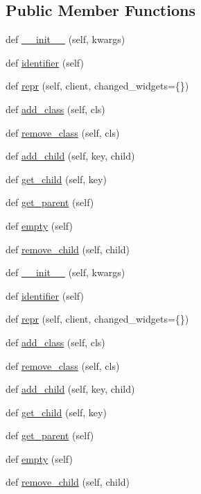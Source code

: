 \subsection*{Public Member Functions}
\begin{DoxyCompactItemize}
\item 
def \hyperlink{classremi_1_1gui_1_1Tag_ac6cbf96099450073941155428905ae42}{\+\_\+\+\_\+init\+\_\+\+\_\+} (self, kwargs)
\item 
def \hyperlink{classremi_1_1gui_1_1Tag_af8e3045fefdaee8350adb573f9207c50}{identifier} (self)
\item 
def \hyperlink{classremi_1_1gui_1_1Tag_a4bd241477678dc78202f410be8d53f75}{repr} (self, client, changed\+\_\+widgets=\{\})
\item 
def \hyperlink{classremi_1_1gui_1_1Tag_a5af9ed8999b079e1cedb146c7ab64895}{add\+\_\+class} (self, cls)
\item 
def \hyperlink{classremi_1_1gui_1_1Tag_a8d42feed3ed238c463702029fdf390c3}{remove\+\_\+class} (self, cls)
\item 
def \hyperlink{classremi_1_1gui_1_1Tag_a1832fc4774b5de4542d4b6a566b871fa}{add\+\_\+child} (self, key, child)
\item 
def \hyperlink{classremi_1_1gui_1_1Tag_a1a99f062371ba2b0e02aeaec3f227b92}{get\+\_\+child} (self, key)
\item 
def \hyperlink{classremi_1_1gui_1_1Tag_acd91844c0df37f7216fb5df0fade0e86}{get\+\_\+parent} (self)
\item 
def \hyperlink{classremi_1_1gui_1_1Tag_ab960edece792bd24bec6b052cc412f40}{empty} (self)
\item 
def \hyperlink{classremi_1_1gui_1_1Tag_a1907efeb216714a9eaf6a561bb272715}{remove\+\_\+child} (self, child)
\item 
def \hyperlink{classremi_1_1gui_1_1Tag_ac6cbf96099450073941155428905ae42}{\+\_\+\+\_\+init\+\_\+\+\_\+} (self, kwargs)
\item 
def \hyperlink{classremi_1_1gui_1_1Tag_af8e3045fefdaee8350adb573f9207c50}{identifier} (self)
\item 
def \hyperlink{classremi_1_1gui_1_1Tag_a4bd241477678dc78202f410be8d53f75}{repr} (self, client, changed\+\_\+widgets=\{\})
\item 
def \hyperlink{classremi_1_1gui_1_1Tag_a5af9ed8999b079e1cedb146c7ab64895}{add\+\_\+class} (self, cls)
\item 
def \hyperlink{classremi_1_1gui_1_1Tag_a8d42feed3ed238c463702029fdf390c3}{remove\+\_\+class} (self, cls)
\item 
def \hyperlink{classremi_1_1gui_1_1Tag_a1832fc4774b5de4542d4b6a566b871fa}{add\+\_\+child} (self, key, child)
\item 
def \hyperlink{classremi_1_1gui_1_1Tag_a1a99f062371ba2b0e02aeaec3f227b92}{get\+\_\+child} (self, key)
\item 
def \hyperlink{classremi_1_1gui_1_1Tag_acd91844c0df37f7216fb5df0fade0e86}{get\+\_\+parent} (self)
\item 
def \hyperlink{classremi_1_1gui_1_1Tag_ab960edece792bd24bec6b052cc412f40}{empty} (self)
\item 
def \hyperlink{classremi_1_1gui_1_1Tag_a1907efeb216714a9eaf6a561bb272715}{remove\+\_\+child} (self, child)
\end{DoxyCompactItemize}
